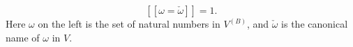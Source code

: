 $$[\![\omega = \check{\omega}]\!] = 1.$$
Here $\omega$ on the left is the set of natural numbers in $V^{(B)}$, and $\check{\omega}$ is the canonical name of $\omega$ in $V$.
